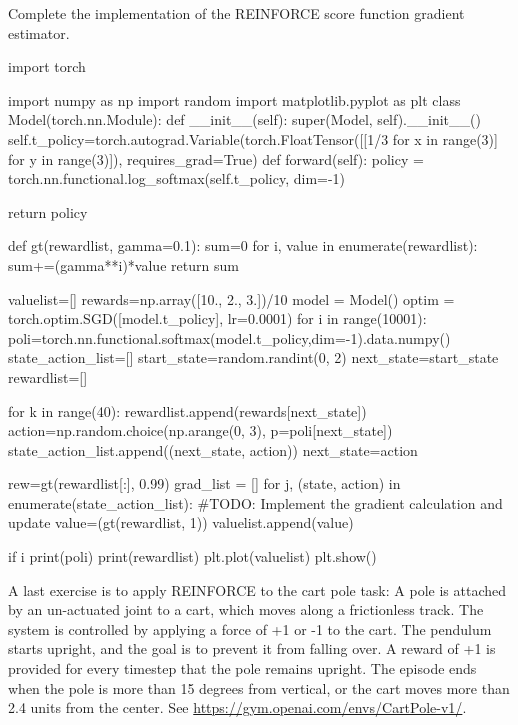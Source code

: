 \begin{exercise}
Complete the implementation of the REINFORCE score function gradient estimator.
\begin{python}
import torch

import numpy as np
import random
import matplotlib.pyplot as plt
class Model(torch.nn.Module):
    def __init__(self):
        super(Model, self).__init__()
        self.t_policy=torch.autograd.Variable(torch.FloatTensor([[1/3 for x in range(3)] for y in range(3)]), requires_grad=True)
    def forward(self):
        policy = torch.nn.functional.log_softmax(self.t_policy, dim=-1)
        
        return policy

def gt(rewardlist, gamma=0.1):
    sum=0
    for i, value in enumerate(rewardlist):
        sum+=(gamma**i)*value
    return sum

valuelist=[] 
rewards=np.array([10., 2., 3.])/10
model = Model()
optim = torch.optim.SGD([model.t_policy], lr=0.0001)
for i in range(10001): 
    poli=torch.nn.functional.softmax(model.t_policy,dim=-1).data.numpy()
    state_action_list=[] 
    start_state=random.randint(0, 2)
    next_state=start_state
    rewardlist=[] 

    for k in range(40):
        rewardlist.append(rewards[next_state])
        action=np.random.choice(np.arange(0, 3), p=poli[next_state])
        state_action_list.append((next_state, action)) 
        next_state=action 


    rew=gt(rewardlist[:], 0.99)
    grad_list = []
    for j, (state, action) in enumerate(state_action_list):
    #TODO: Implement the gradient calculation and update
    value=(gt(rewardlist, 1))
    valuelist.append(value)


    if i%
        print(poli)
        print(rewardlist)
        plt.plot(valuelist)
        plt.show()
\end{python}
\end{exercise}

A last exercise is to apply REINFORCE to the cart pole task: A pole is attached by an un-actuated joint to a cart, which moves along a frictionless track. The system is controlled by applying a force of +1 or -1 to the cart. The pendulum starts upright, and the goal is to prevent it from falling over. A reward of +1 is provided for every timestep that the pole remains upright. The episode ends when the pole is more than 15 degrees from vertical, or the cart moves more than 2.4 units from the center. See \url{ https://gym.openai.com/envs/CartPole-v1/}.

